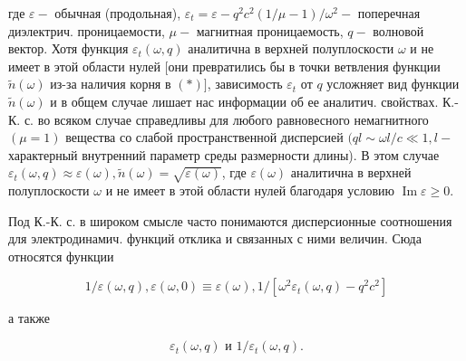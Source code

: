 \documentclass[10pt]{article}
\begin{document}
где $\varepsilon-$ обычная (продольная), $\varepsilon_{t}=\varepsilon-q^{2} c^{2}(1 / \mu-1) / \omega^{2}-$ поперечная диэлектрич. проницаемости, $\mu-$ магнитная проницаемость, $q-$ волновой вектор. Хотя функция $\varepsilon_{t}(\omega, q)$ аналитична в верхней полуплоскости $\omega$ и не имеет в этой области нулей [они превратились бы в точки ветвления функции $\widetilde{n}(\omega)$ из-за наличия корня в $(*)]$, зависимость $\varepsilon_{t}$ от $q$ усложняет вид функции $\tilde{n}(\omega)$ и в общем случае лишает нас информации об ее аналитич. свойствах. К.-К. с. во всяком случае справедливы для любого равновесного немагнитного $(\mu=1)$ вещества со слабой пространственной дисперсией $(q l \sim \omega l / c \ll 1, l-$ характерный внутренний параметр среды размерности длины). В этом случае $\varepsilon_{t}(\omega, q) \approx \varepsilon(\omega), \tilde{n}(\omega)=\sqrt{\varepsilon(\omega)}$, где $\varepsilon(\omega)$ аналитична в верхней полуплоскости $\omega$ и не имеет в этой области нулей благодаря условию $\operatorname{Im} \varepsilon \geqslant 0$.



Под К.-К. с. в широком смысле часто понимаются дисперсионные соотношения для электродинамич. функций отклика и связанных с ними величин. Сюда относятся функции



\[

1 / \varepsilon(\omega, q), \varepsilon(\omega, 0) \equiv \varepsilon(\omega), 1 /\left[\omega^{2} \varepsilon_{t}(\omega, q)-q^{2} c^{2}\right]

\]



а также



\[

\varepsilon_{t}(\omega, q) \text { и } 1 / \varepsilon_{t}(\omega, q) .

\]
\end{document}
